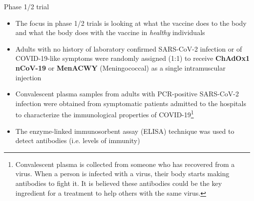 \documentclass[10pt,handout]{beamer}\usepackage[]{graphicx}\usepackage[]{color}
\begin{document}
\begin{frame}{Phase 1/2 trial}
	\begin{itemize}
		\item The focus in phase 1/2 trials is looking at what the vaccine does to the body and what the body does with the vaccine in \textit{healthy} individuals
		\item Adults with no history of laboratory confirmed SARS-CoV-2 infection or of COVID-19-like symptoms were randomly assigned (1:1) to receive \textbf{ChAdOx1 nCoV-19} or \textbf{MenACWY} (Meningococcal) as a single intramuscular injection
		\item Convalescent plasma samples from adults with PCR-positive SARS-CoV-2 infection were obtained from symptomatic patients admitted to the hospitals to characterize the
		immunological properties of COVID-19\footnote{\tiny{Convalescent plasma is collected from someone who has recovered from a virus. When a person is infected with a virus, their body starts making antibodies to fight it. It is believed these antibodies could be the key ingredient for a treatment to help others with the same virus.}}
		\item The enzyme-linked immunosorbent assay (ELISA) technique was used to detect antibodies (i.e. levels of immunity)
		
	\end{itemize}
\end{frame}
\end{document}
